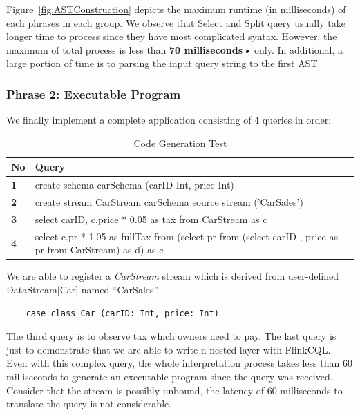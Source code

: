 Figure~\ref{fig:ASTConstruction} depicts the maximum runtime (in milliseconds) of each phrases in each group. We observe that Select and Split query usually take longer time to process since they have most complicated syntax. However, the maximum of total process is less than \textbf{70 milliseconds\textit{•}} only. In additional, a large portion of time is to parsing the input query string to the first AST. 

\subsubsection{Phrase 2: Executable Program}



We finally implement a complete application consisting of 4 queries in order:

\begin{table}[h!]
\caption{Code Generation Test}
\centering
\label{table:GenerationTest}
\setlength\extrarowheight{5pt}
\begin{tabular}{||>{\centering\bfseries}m{0.5in}|>{\centering\arraybackslash}m{5in}||}
\hline
\textbf{No} & \textbf{Query} \\ \hline\hline
     		1 & 	       create schema carSchema (carID Int, price Int)\\ \hline
     		2 & create stream CarStream carSchema source stream ('CarSales')	       \\ \hline
     	3 & 		select carID, c.price * 0.05 as tax from CarStream as c       \\ \hline
     	4 &	select c.pr * 1.05 as fullTax from (select pr from (select carID , price  as pr from CarStream) as d) as c	       \\ \hline
	           				
 \end{tabular}
\end{table}

We are able to register a \textit{CarStream} stream which is derived from user-defined DataStream[Car] named ``CarSales''
\begin{lstlisting}
 	case class Car (carID: Int, price: Int)
\end{lstlisting}

The third query is to observe tax which owners need to pay. The last query is just to demonstrate that we are able to write n-nested layer with FlinkCQL. Even with this complex query, the whole interpretation process takes less than 60 milliseconds to generate an executable program since the query was received.  Consider that the stream is possibly unbound, the latency of 60 milliseconds to translate the query is not considerable. 

